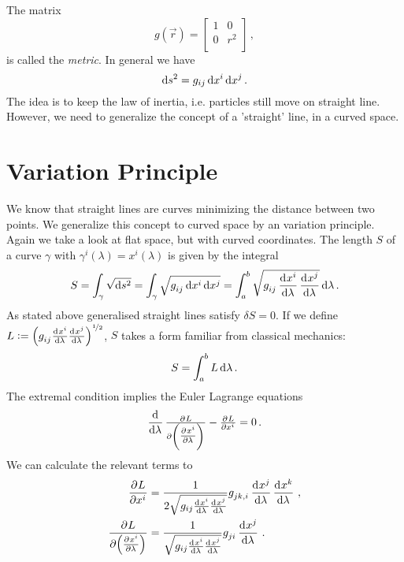 The matrix
\begin{equation}
    g(\vec{r})=
    \begin{bmatrix}
        1& 0\\
        0& r^2\\
    \end{bmatrix}\, ,
\end{equation}
is called the \emph{metric}.
In general we have
\begin{equation}
    \dif s^2 = g_{ij}\dif x^i\dif x^j\, .
\end{equation}
The idea is to keep the law of inertia, i.e. particles still move on straight
line. However, we need to generalize the concept of a 'straight' line, in a
curved space.
\section{Variation Principle}
We know that straight lines are curves minimizing the distance between two
points. We generalize this concept to curved space by an variation principle.
Again we take a look at flat space, but with curved coordinates.
The length $S$ of a curve $\gamma$ with $\gamma^i(\lambda) = x^i(\lambda)$ is
given by the integral
\begin{equation}
    S=\int_{\gamma}\sqrt{\dif s^2} =
    \int_{\gamma}\sqrt{\tensor{g}{_i_j}\dif \tensor{x}{^i}\dif
    \tensor{x}{^j}}=\int_{a}^{b}\sqrt{\tensor{g}{_i_j}\dod{\tensor{x}{^i}}{\lambda}
    \dod{\tensor{x}{^j}}{\lambda}}\dif \lambda\, .
\end{equation}
As stated above generalised straight lines satisfy $\delta S = 0$. If we define
$L:=\left(\tensor{g}{_i_j}\od{\tensor{x}{^i}}{\lambda}
\od{\tensor{x}{^j}}{\lambda}\right)^{\nicefrac{1}{2}}$, $S$ takes a form
familiar from classical mechanics:
\begin{equation}
    S=\int_a^b L\dif \lambda\, .
\end{equation}
The extremal condition implies the Euler Lagrange equations
\begin{equation}
    \dod{}{\lambda}\pd{L}{\left(\pd{\tensor{x}{^i}}{\lambda}\right)}
    -\pd{L}{\tensor{x}{^i}}
    =0\, .		\end{equation}
We can calculate the relevant terms to 
\begin{align}
\dpd{L}{\tensor{x}{^i}}&=\frac{1}{2\sqrt{g_{ij}\od{x^i}{\lambda}
\od{x^j}{\lambda}}}\tensor{g}{_j_k_{,i}}\dod{x^j}{\lambda}
\dod{x^k}{\lambda}\,,\\
\dpd{L}{\left(\pd{\tensor{x}{^i}}{\lambda}\right)}
&=\frac{1}{\sqrt{g_{ij}\od{x^i}{\lambda}
\od{x^j}{\lambda}}}\tensor{g}{_j_i}\dod{x^j}{\lambda}\, .
\end{align}
